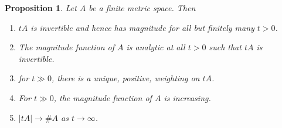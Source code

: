 \documentclass[11pt]{article}
\theoremstyle{definition}
\theoremstyle{definition}
\theoremstyle{plain}
\theoremstyle{plain}
\newtheorem{prop}[defn]{Proposition}
\theoremstyle{plain}
\theoremstyle{definition}
\begin{document}
\begin{prop}\label{prop:approach}
Let $A$ be a finite metric space. Then
\begin{enumerate}[label=(\roman*)]
\item $tA$ is invertible and hence has magnitude for all but finitely many $t > 0$.
\item The magnitude function of $A$ is analytic at all $t>0$ such that $tA$ is invertible.
\item for $t \gg 0$, there is a unique, positive, weighting on $tA$.
\item For $t \gg 0$, the magnitude function of $A$ is increasing.
\item $\vert tA \vert \to \#A$ as $t \to \infty$.
\end{enumerate}
\end{prop}
\end{document}
